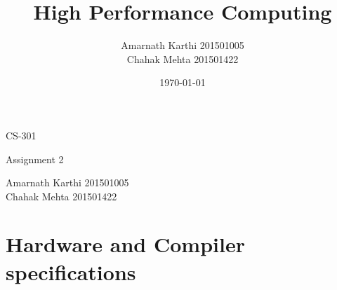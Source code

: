 \documentclass[12,a4paper]{article}
\title{High Performance Computing}
\date{\today}
\author{Amarnath Karthi  201501005 \\ Chahak Mehta  201501422}
\begin{document}
    \begin{titlepage}
	\centering
	{\scshape\LARGE CS-301 \par}
	\vspace{0.1cm}
	{\huge \@title \par}
	\vspace{0.5cm}
	{\Large Assignment 2\par}
	\vspace{10cm}
	\Large Amarnath Karthi          201501005\\
	\Large Chahak Mehta             201501422\\
	\vspace{5cm}
	{\large \@date\par}
    \end{titlepage}
    
    
    \section{Hardware and Compiler specifications}
    \renewcommand{\arraystretch}{1.5}
\end{document}
